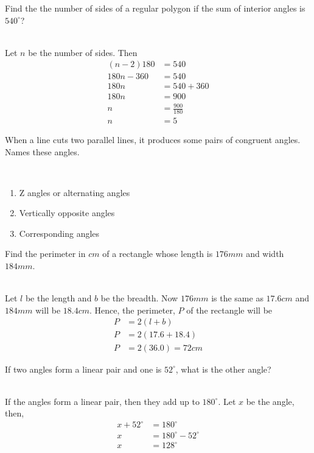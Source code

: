 \documentclass[addpoints,12pt]{exam}
\begin{document}
\begin{questions}
 \question Find the the number of sides of a regular polygon if the sum of interior angles is 
$540^\circ$?
	\ifprintanswers
	  \begin{solution}\\
		Let $n$ be the number of sides. Then 
		\begin{align} 
		  (n-2)180 &= 540 \\
		  180n - 360 &= 540 \\
		  180n &= 540 + 360 \\
		  180n &= 900 \\
		  n &= \frac{900}{180} \\
		  n &= 5
		\end{align}

	  \end{solution}
	\else
	  \makeemptybox{1.33in}
	\fi
	
 \question When a line cuts two parallel lines, it produces some pairs of congruent angles. Names 
these angles.
	\ifprintanswers
	  \begin{solution}\\
		\begin{enumerate}
		 \item Z angles or alternating angles
		 \item Vertically opposite angles
		 \item Corresponding angles
		\end{enumerate}

	  \end{solution}
	\else
	  \makeemptybox{1.33in}
	\fi
	
 \question Find the perimeter in $cm$ of a rectangle whose length is $176mm$ and width 
$184mm$.
	\ifprintanswers
	  \begin{solution}\\
		Let $l$ be the length and $b$ be the breadth. Now $176mm$ is the same as $17.6cm$ and 
$184mm$ will be $18.4cm$. Hence, the perimeter, $P$ of the rectangle will be
		\begin{align}
		  P &= 2(l + b) \\
		  P &= 2(17.6 + 18.4) \\
		  P &= 2( 36.0) = 72cm
		\end{align}

	  \end{solution}
	\else
	  \makeemptybox{1.33in}
	\fi
	
	
 \question If two angles form a linear pair and one is $52^\circ$, what is the other angle?
	\ifprintanswers
	  \begin{solution}\\
		If the angles form a linear pair, then they add up to $180^\circ$. Let $x$ be the angle, 
then,
		\begin{align}
		  x + 52^\circ &= 180^\circ \\
		  x &= 180^\circ-52^\circ \\
		x &= 128^\circ
		\end{align}


\end{solution}
\end{questions}
\end{document}
